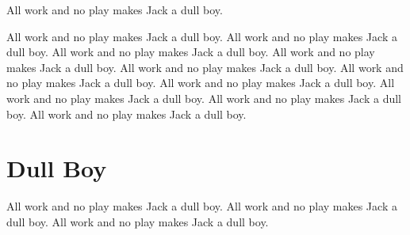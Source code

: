 \documentclass[12pt]{article}
\begin{document}
All work and no play makes Jack a dull boy.

All work and no play makes Jack a dull boy.
All work and no play makes Jack a dull boy.
All work and no play makes Jack a dull boy.
All work and no play makes Jack a dull boy.
All work and no play makes Jack a dull boy.
All work and no play makes Jack a dull boy.
All work and no play makes Jack a dull boy.
All work and no play makes Jack a dull boy.
All work and no play makes Jack a dull boy.
All work and no play makes Jack a dull boy.

\section{Dull Boy}

All work and no play makes Jack a dull boy.
All work and no play makes Jack a dull boy.
All work and no play makes Jack a dull boy.
\end{document}
